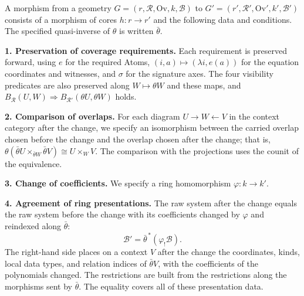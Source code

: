 \begin{definition}\label{def:1.30}

A morphism from a geometry $G=(r,\mathcal{R},\mathrm{Ov},k,\mathcal{B})$ to
$G'=(r',\mathcal{R}',\mathrm{Ov}',k',\mathcal{B}')$ consists of a morphism of
cores $h:r\to r'$ and the following data and conditions.
The specified quasi-inverse of $\theta$ is written $\bar\theta$.

\textbf{1. Preservation of coverage requirements.} Each requirement is
preserved forward, using $e$ for the required Atoms,
$(i,a)\mapsto(\lambda i,e(a))$ for the equation coordinates and witnesses, and
$\sigma$ for the signature axes.
The four visibility predicates are also preserved along $W\mapsto\theta W$ and
these maps, and
$B_{\mathcal{R}}(U,W)\Rightarrow B_{\mathcal{R}'}(\theta U,\theta W)$ holds.

\textbf{2. Comparison of overlaps.} For each diagram $U\to W\leftarrow V$ in
the context category after the change, we specify an isomorphism between the
carried overlap chosen before the change and the overlap chosen after the
change; that is,
$\theta(\bar\theta U\times_{\bar\theta W}\bar\theta V)\cong U\times_W V$.
The comparison with the projections uses the counit of the equivalence.

\textbf{3. Change of coefficients.} We specify a ring homomorphism
$\varphi:k\to k'$.

\textbf{4. Agreement of ring presentations.} The raw system after the change
equals the raw system before the change with its coefficients changed by
$\varphi$ and reindexed along $\bar\theta$:
\begin{equation*}
\mathcal{B}'=\bar\theta^{\,*}(\varphi_!\mathcal{B}).
\tag{1.13}\label{eq:1.13}
\end{equation*}
The right-hand side places on a context $V$ after the change the coordinates,
kinds, local data types, and relation indices of $\bar\theta V$, with the
coefficients of the polynomials changed.
The restrictions are built from the restrictions along the morphisms sent by
$\bar\theta$.
The equality covers all of these presentation data.


\end{definition}

